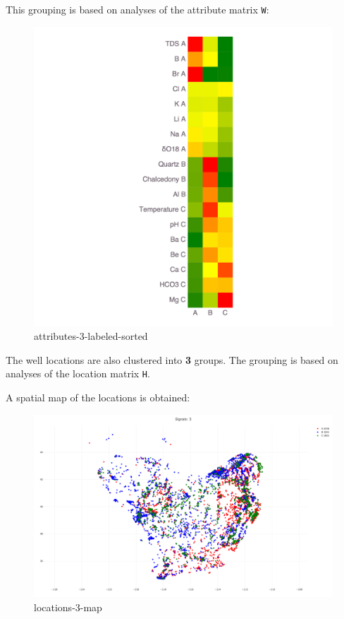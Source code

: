 \documentclass[11pt]{article}
\begin{document}
    This grouping is based on analyses of the attribute matrix \texttt{W}:

\begin{figure}
\centering
\includegraphics{../figures-postprocessing-nl-640/attributes-3-labeled-sorted.png}
\caption{attributes-3-labeled-sorted}
\end{figure}

The well locations are also clustered into \textbf{3} groups. The
grouping is based on analyses of the location matrix \texttt{H}.

A spatial map of the locations is obtained:

\begin{figure}
\centering
\includegraphics{../figures-postprocessing-nl-640/locations-3-map.png}
\caption{locations-3-map}
\end{figure}
\end{document}

